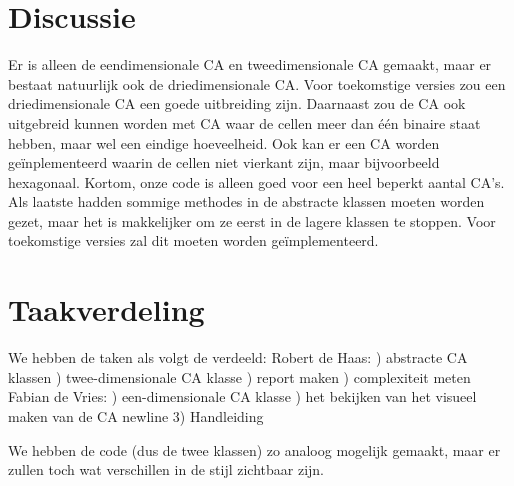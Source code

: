 \documentclass[12pt,a4paper]{article}
\begin{document}
\section*{Discussie}
Er is alleen de eendimensionale CA en tweedimensionale 
CA gemaakt, maar er bestaat natuurlijk ook de driedimensionale CA.
Voor toekomstige versies zou een driedimensionale CA een goede uitbreiding zijn.
Daarnaast zou de CA ook uitgebreid kunnen worden met CA waar de cellen meer dan één binaire staat hebben, maar wel een eindige hoeveelheid.
Ook kan er een CA worden geïnplementeerd waarin de cellen niet vierkant zijn, maar bijvoorbeeld hexagonaal.
Kortom, onze code is alleen goed voor een heel beperkt aantal CA's.
Als laatste hadden sommige methodes in de abstracte klassen moeten worden gezet, maar het 
is makkelijker om ze eerst in de lagere klassen te stoppen.
Voor toekomstige versies zal dit moeten worden geïmplementeerd. 

\newpage
\section*{Taakverdeling}
We hebben de taken als volgt de verdeeld:
\vspace{6pt}
\newline
Robert de Haas:
) abstracte CA klassen
) twee-dimensionale CA klasse
) report maken
) complexiteit meten
\vspace{6pt}
\newline
Fabian de Vries:
) een-dimensionale CA klasse
) het bekijken van het visueel maken van de CA
newline
3) Handleiding 


We hebben de code (dus de twee klassen) zo analoog mogelijk gemaakt, maar er zullen toch wat verschillen in de stijl zichtbaar zijn.

  
\end{document}
